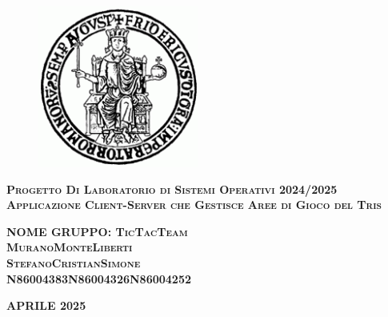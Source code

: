 \documentclass{report}
\begin{document}
    \begin{figure}[htbp!]
        \begin{center}
            \includegraphics[width=.25\textwidth]{immagini/unina.png}
        \end{center}
    \end{figure}
\begin{center}
    {\scshape\Large\bfseries\center  Progetto Di Laboratorio di Sistemi Operativi 2024/2025 \\ Applicazione Client-Server che Gestisce Aree di Gioco del Tris}
\end{center}
\vfill
    \begin{center}
        {\scshape\Large\bfseries\center NOME GRUPPO: TicTacTeam} \\
        {\scshape\Large\bfseries\center 
            Murano\space\space\space     Monte\space\space\space\space      Liberti\\
            Stefano\space\space\space    Cristian\space\space\space\space   Simone\\
            N86004383\space\space\space  N86004326\space\space\space        N86004252\\}
        
		\begin{center}
			  {\scshape\Large\bfseries\center APRILE 2025} 
		\end{center}			
    \end{center}
    \newpage
    
    \tableofcontents
    
    
\end{document}
